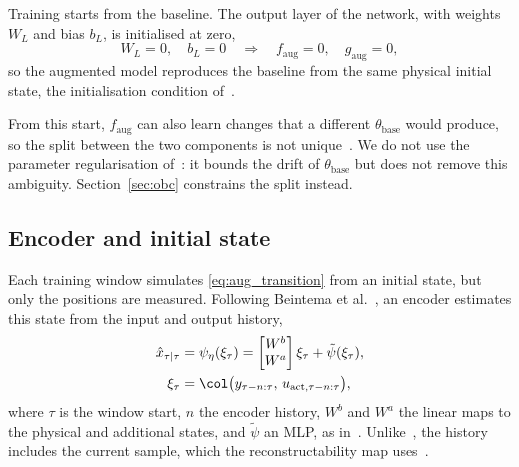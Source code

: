 Training starts from the baseline.
The output layer of the network, with weights $W_L$ and bias $b_L$, is
initialised at zero,
\begin{equation}
 W_L=0,\quad b_L=0
 \quad\Longrightarrow\quad
 f_{\mathrm{aug}}=0,\quad g_{\mathrm{aug}}=0 ,
 \label{eq:aug_zero_init}
\end{equation}
so the augmented model reproduces the baseline from the same physical
initial state, the initialisation condition
of~\cite[Eq.~(29)]{hoekstra2026lfr}.

From this start, $f_{\mathrm{aug}}$ can also learn changes that a different
$\theta_{\mathrm{base}}$ would produce, so the split between the two
components is not unique~\cite[Sec.~5.2]{hoekstra2026lfr}.
We do not use the parameter regularisation
of~\cite[Eq.~(26)]{hoekstra2026lfr}: it bounds the drift of
$\theta_{\mathrm{base}}$ but does not remove this ambiguity.
Section~\ref{sec:obc} constrains the split instead.

\subsection{Encoder and initial state}\label{sec:aug_encoder}
Each training window simulates \eqref{eq:aug_transition} from an initial
state, but only the positions are measured.
Following Beintema et al.~\cite{beintema2023subnet}, an encoder estimates
this state from the input and output history,
\begin{equation}
\begin{aligned}
 \hat x_{\tau|\tau}&=\psi_\eta(\xi_\tau)
 =\begin{bmatrix}W^b\\ W^a\end{bmatrix}\xi_\tau+\tilde\psi(\xi_\tau),\\
 \xi_\tau&=\col\bigl(y_{\tau-n:\tau},\,u_{\mathrm{act},\tau-n:\tau}\bigr),
\end{aligned}
\label{eq:aug_encoder}
\end{equation}
where $\tau$ is the window start, $n$ the encoder history, $W^b$ and $W^a$
the linear maps to the physical and additional states, and $\tilde\psi$ an
MLP, as in~\cite[Eq.~(8)]{hoekstra2026encoder}.
Unlike~\cite[Eq.~(8)]{hoekstra2026encoder}, the history includes the
current sample, which the reconstructability map
uses~\cite[Eq.~(15)]{hoekstra2026encoder}.

